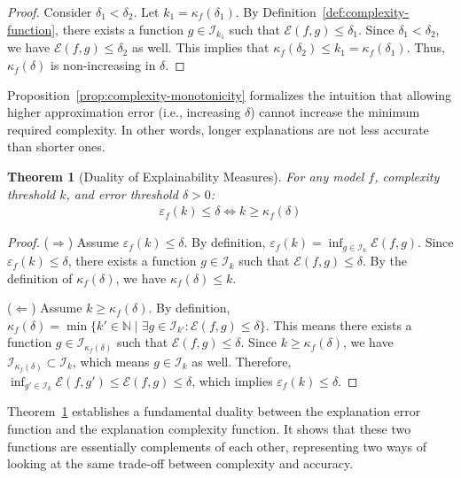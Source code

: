 \documentclass[11pt,letter,leqno]{article}
\newtheorem{theorem}{Theorem}[section]
\begin{document}
\begin{proof}
Consider $\delta_1 < \delta_2$. Let $k_1 = \kappa_f(\delta_1)$. By Definition~\ref{def:complexity-function}, there exists a function $g \in \mathcal{I}_{k_1}$ such that $\mathcal{E}(f, g) \leq \delta_1$. Since $\delta_1 < \delta_2$, we have $\mathcal{E}(f, g) \leq \delta_2$ as well. This implies that $\kappa_f(\delta_2) \leq k_1 = \kappa_f(\delta_1)$. Thus, $\kappa_f(\delta)$ is non-increasing in $\delta$.
\end{proof}

Proposition~\ref{prop:complexity-monotonicity} formalizes the intuition that allowing higher approximation error (i.e., increasing $\delta$) cannot increase the minimum required complexity.  In other words, longer explanations are not less accurate than shorter ones.

\begin{theorem}[Duality of Explainability Measures]
\label{thm:duality}
For any model $f$, complexity threshold $k$, and error threshold $\delta > 0$:
\begin{align}
\varepsilon_f(k) \leq \delta \iff k \geq \kappa_f(\delta)
\end{align}
\end{theorem}

\begin{proof}
($\Rightarrow$) Assume $\varepsilon_f(k) \leq \delta$.  By definition, $\varepsilon_f(k) = \inf_{g \in \mathcal{I}_k} \mathcal{E}(f, g)$.  Since $\varepsilon_f(k) \leq \delta$, there exists a function $g \in \mathcal{I}_k$ such that $\mathcal{E}(f, g) \leq \delta$. By the definition of $\kappa_f(\delta)$, we have $\kappa_f(\delta) \leq k$.

($\Leftarrow$) Assume $k \geq \kappa_f(\delta)$.  By definition, $\kappa_f(\delta) = \min\{k' \in \mathbb{N} \mid \exists g \in \mathcal{I}_{k'} : \mathcal{E}(f, g) \leq \delta\}$.  This means there exists a function $g \in \mathcal{I}_{\kappa_f(\delta)}$ such that $\mathcal{E}(f, g) \leq \delta$.  Since $k \geq \kappa_f(\delta)$, we have $\mathcal{I}_{\kappa_f(\delta)} \subset \mathcal{I}_k$, which means $g \in \mathcal{I}_k$ as well. Therefore, $\inf_{g' \in \mathcal{I}_k} \mathcal{E}(f, g') \leq \mathcal{E}(f, g) \leq \delta$, which implies $\varepsilon_f(k) \leq \delta$.
\end{proof}

Theorem~\ref{thm:duality} establishes a fundamental duality between the explanation error function and the explanation complexity function.  It shows that these two functions are essentially complements of each other, representing two ways of looking at the same trade-off between complexity and accuracy.
\end{document}
